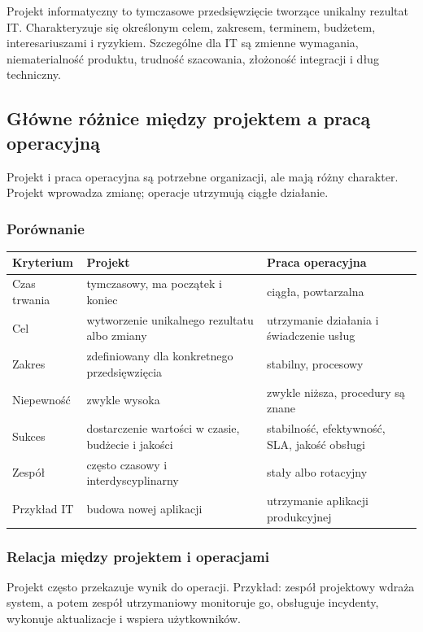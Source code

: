 Projekt informatyczny to tymczasowe przedsięwzięcie tworzące unikalny rezultat IT. Charakteryzuje się określonym celem, zakresem, terminem, budżetem, interesariuszami i ryzykiem. Szczególne dla IT są zmienne wymagania, niematerialność produktu, trudność szacowania, złożoność integracji i dług techniczny.

\subsection{Główne różnice między projektem a pracą operacyjną}

Projekt i praca operacyjna są potrzebne organizacji, ale mają różny charakter. Projekt wprowadza zmianę; operacje utrzymują ciągłe działanie.

\subsubsection{Porównanie}

\begin{longtable}{p{}p{}p{}}
\toprule
Kryterium & Projekt & Praca operacyjna \\
\midrule
Czas trwania & tymczasowy, ma początek i koniec & ciągła, powtarzalna \\
Cel & wytworzenie unikalnego rezultatu albo zmiany & utrzymanie działania i świadczenie usług \\
Zakres & zdefiniowany dla konkretnego przedsięwzięcia & stabilny, procesowy \\
Niepewność & zwykle wysoka & zwykle niższa, procedury są znane \\
Sukces & dostarczenie wartości w czasie, budżecie i jakości & stabilność, efektywność, SLA, jakość obsługi \\
Zespół & często czasowy i interdyscyplinarny & stały albo rotacyjny \\
Przykład IT & budowa nowej aplikacji & utrzymanie aplikacji produkcyjnej \\
\bottomrule
\end{longtable}

\subsubsection{Relacja między projektem i operacjami}

Projekt często przekazuje wynik do operacji. Przykład: zespół projektowy wdraża system, a potem zespół utrzymaniowy monitoruje go, obsługuje incydenty, wykonuje aktualizacje i wspiera użytkowników.

